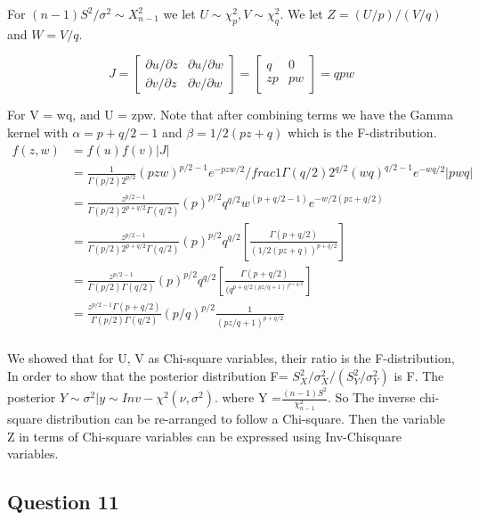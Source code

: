 \documentclass[
]{book}
\theoremstyle{definition}
\theoremstyle{definition}
\theoremstyle{definition}
\theoremstyle{definition}
\theoremstyle{remark}
\begin{document}
For \((n-1)S^2/\sigma^2 \sim X_{n-1}^2\) we let \(U \sim \chi_p^2, V\sim \chi_q^2\). We let \(Z = (U/p)/(V/q)\) and \(W=V/q\).

\[
J= 
\begin{bmatrix}
 \partial u/\partial z & \partial u/\partial w \\
 \partial v/\partial z & \partial v/\partial w  
\end{bmatrix} = 
\begin{bmatrix}
 q & 0 \\
  zp& pw  \\
\end{bmatrix} = qpw
\]

For V = wq, and U = zpw. Note that after combining terms we have the Gamma kernel with \(\alpha = p+q/2 -1\) and \(\beta= 1/2(pz+q)\) which is the F-distribution.\\
\[
\begin{aligned}
f(z,w)&= f(u)f(v)|J| \\
 &= \frac{1}{\Gamma(p/2)2^{p/2}}(pzw)^{p/2-1}e^{-pzw/2}/frac{1}{\Gamma(q/2)2^{q/2}}(wq)^{q/2-1}e^{-wq/2}|pwq| \\
 &=\frac{z^{p/2-1}}{\Gamma(p/2)2^{p+q/2}\Gamma(q/2)}(p)^{p/2}q^{q/2}w^{(p+q/2 -1)} e^{-w/2(pz+q/2)} \\
 & = \frac{z^{p/2-1}}{\Gamma(p/2)2^{p+q/2}\Gamma(q/2)}(p)^{p/2}q^{q/2}[\frac{\Gamma(p+q/2)}{(1/2(pz+q))^{p+q/2}}]\\
 &= \frac{z^{p/2-1}}{\Gamma(p/2)\Gamma(q/2)}(p)^{p/2}q^{q/2}[\frac{\Gamma(p+q/2)}{(q^{p+q/2(pz/q+1))^{p+q/2}}}]\\
 &=\frac{z^{p/2-1}\Gamma(p+q/2)}{\Gamma(p/2)\Gamma(q/2)}(p/q)^{p/2}\frac{1}{(pz/q+1)^{p+q/2}} \\
\end{aligned}
\]

We showed that for U, V as Chi-square variables, their ratio is the F-distribution, In order to show that the posterior distribution F= \(S_X^2/\sigma^2_X / (S_Y^2 / \sigma_Y^2)\) is F. The posterior \(Y \sim \sigma^2 | y \sim Inv-\chi^2(\nu, \sigma^2)\). where Y =\(\frac{(n-1)S^2}{\chi_{n-1}^2}\). So The inverse chi-square distribution can be re-arranged to follow a Chi-square. Then the variable Z in terms of Chi-square variables can be expressed using Inv-Chisquare variables.

\hypertarget{question-11-1}{%
\subsection*{Question 11}\label{question-11-1}}
\end{document}
